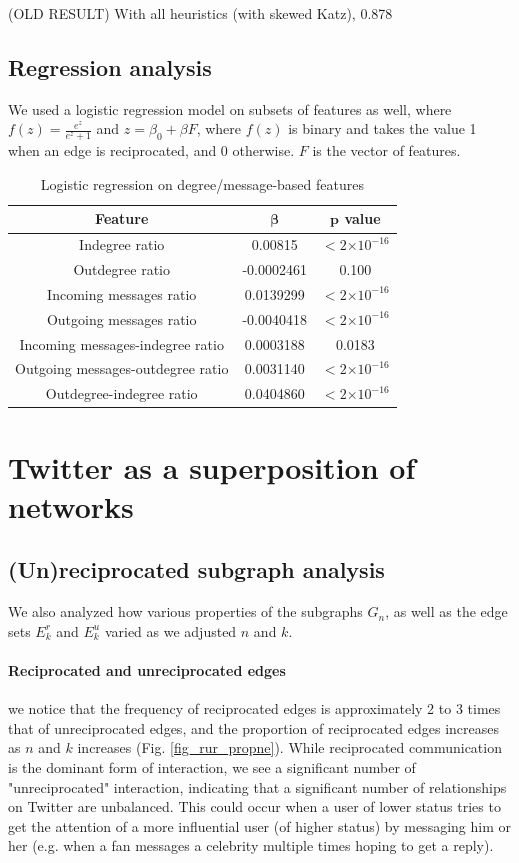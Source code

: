 \documentclass[conference]{IEEEtran}
\providecommand{\e}[1]{\ensuremath{\times 10^{#1}}}
\begin{document}
(OLD RESULT) With all heuristics (with skewed Katz), 0.878

\subsection{Regression analysis}
We used a logistic regression model on subsets of features as well, where $f(z) = \frac{e^z}{e^z+1}$ and $z = \beta_0 + \beta F$, where $f(z)$ is binary and takes the value 1 when an edge is reciprocated, and 0 otherwise. $F$ is the vector of features.

\begin{table}[!t]
\renewcommand{\arraystretch}{1.3}
\caption{Logistic regression on degree/message-based features}
\label{table_recresults_indeg}
\centering
\begin{tabular}{|c||c|c|}
\hline
\bf{Feature} & $\mathbf{\beta}$ & $\mathbf{p}$ value \\
\hline
Indegree ratio & 0.00815 & $< 2 \e{-16} $ \\
Outdegree ratio & -0.0002461 & 0.100 \\
Incoming messages ratio & 0.0139299 & $< 2 \e{-16} $ \\
Outgoing messages ratio & -0.0040418 & $< 2 \e{-16} $ \\
Incoming messages-indegree ratio & 0.0003188 & 0.0183 \\
Outgoing messages-outdegree ratio & 0.0031140 & $< 2 \e{-16} $ \\
Outdegree-indegree ratio & 0.0404860 & $< 2 \e{-16} $ \\
\hline
\end{tabular}
\end{table}

\section{Twitter as a superposition of networks}

\subsection{(Un)reciprocated subgraph analysis}
We also analyzed how various properties of the subgraphs $G_n$, as well as the edge sets $E^r_k$ and $E^u_k$ varied as we adjusted $n$ and $k$.

\paragraph{Reciprocated and unreciprocated edges} we notice that the frequency of reciprocated edges is approximately 2 to 3 times that of unreciprocated edges, and the proportion of reciprocated edges increases as $n$ and $k$ increases (Fig. \ref{fig_rur_propne}). While reciprocated communication is the dominant form of interaction, we see a significant number of "unreciprocated" interaction, indicating that a significant number of relationships on Twitter are unbalanced. This could occur when a user of lower status tries to get the attention of a more influential user (of higher status) by messaging him or her (e.g. when a fan messages a celebrity multiple times hoping to get a reply). 
\end{document}
